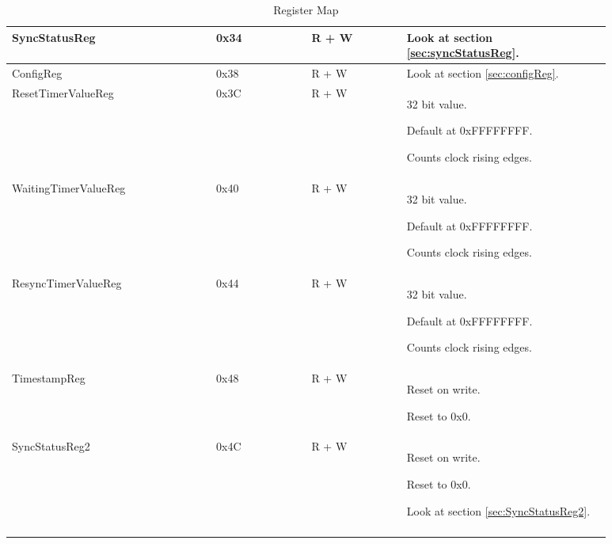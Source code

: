 \begin{longtable} [htb] { |p{0.3\linewidth}|p{0.14\linewidth}|p{0.14\linewidth}|p{0.3\linewidth}| }
	SyncStatusReg&0x34&R + W& Look at section \ref{sec:syncStatusReg}.\\
	\hline
	ConfigReg&0x38&R + W& Look at section \ref{sec:configReg}. \\
	\hline
	ResetTimerValueReg&0x3C&R + W& 32 bit value. \par Default at 0xFFFFFFFF. \par Counts clock rising edges. \\
	\hline
	WaitingTimerValueReg&0x40&R + W&  32 bit value. \par Default at 0xFFFFFFFF. \par Counts clock rising edges. \\
	\hline
	ResyncTimerValueReg&0x44&R + W&  32 bit value. \par Default at 0xFFFFFFFF. \par Counts clock rising edges.\\
	\hline
	TimestampReg&0x48&R + W& Reset on write. \par Reset to 0x0.\\
	\hline
	SyncStatusReg2&0x4C&R + W& Reset on write. \par Reset to 0x0. \par Look at section \ref{sec:SyncStatusReg2}.\\
	\hline
\caption[Register map]{Register Map}
\label{tbl:registeraddress}
\end{longtable}
\renewcommand{\arraystretch}{1.0}
